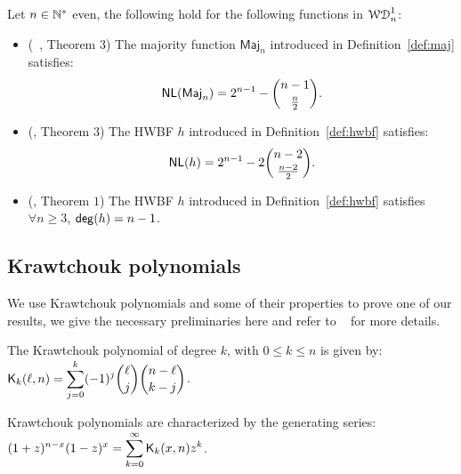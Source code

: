 \documentclass[11pt]{llncs}
\begin{document}


\begin{Prop}
	Let $n\in \mathbb{N}^*$ even, the following hold for the following functions in $\mathcal{WD}^{1}_{n}$: 
	\begin{itemize}
		\item (\eg ~\cite{DCC:DalMaiSar06}, Theorem $3$) The majority function $\textsf{Maj}_n$ introduced in Definition~\ref{def:maj} satisfies:
		\[
		\mathsf{NL}(\textsf{Maj}_n)=2^{n-1}-\binom{n-1}{\frac n2}.
		\]
		\item (\cite{DAM:WCST14}, Theorem $3$) The HWBF $h$ introduced in Definition~\ref{def:hwbf} satisfies:
		\[
		\mathsf{NL}(h)=2^{n-1}-2\binom{n-2}{\frac{n-2}{2}}.
		\]	
		\item (\cite{DAM:WCST14}, Theorem $1$) The HWBF $h$ introduced in Definition~\ref{def:hwbf} satisfies $\forall n \ge 3$, $\mathsf{deg}(h)=n-1$. 	
	\end{itemize}
\end{Prop}



\subsection{Krawtchouk polynomials}
We use Krawtchouk polynomials and some of their properties to prove one of our results, we give the necessary preliminaries here and refer to \eg ~\cite{book:MacSlo78} for more details.

\begin{definition}\label{def:Kraw}
	The Krawtchouk polynomial of degree $k$, with $0\leq k\leq n$ is given by: $ \displaystyle \mathsf{K}_{k}(\ell,n)=\sum_{j=0}^{k} (-1)^j \binom{\ell}{j} \binom{n-\ell}{k-j}$. 
	
	Krawtchouk polynomials are characterized by the generating series: $ \displaystyle (1+z)^{n-x} (1-z)^x=\sum_{k=0}^\infty \mathsf{K}_{k}(x,n) z^k$.
\end{definition}
\end{document}
